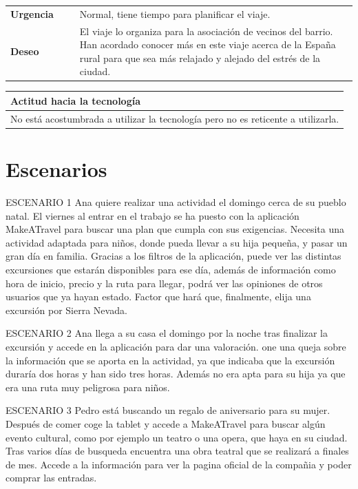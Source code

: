 \documentclass[11pt]{article}
\begin{document}
\begin{table}[H]
	\begin{tabular}{p{0.2\linewidth}|p{0.8\linewidth}}
		\toprule
		\textbf{Urgencia} & Normal, tiene tiempo para planificar el viaje.\\
		\textbf{Deseo}  & El viaje lo organiza para la asociación de vecinos del barrio. Han acordado conocer más en este viaje acerca de la España rural para que sea más relajado y alejado del estrés de la ciudad.\\
		\bottomrule
	\end{tabular}
	
	\begin{tabular}{p{1.028\linewidth}}
		\textbf{Actitud hacia la tecnología}\\
		\midrule
		No está acostumbrada a utilizar la tecnología pero no es reticente a utilizarla.
	\end{tabular}
\end{table}

\newpage
\section{Escenarios}
ESCENARIO 1
Ana quiere realizar una actividad el domingo cerca de su pueblo natal. El viernes al entrar en el trabajo se ha puesto con la aplicación MakeATravel para buscar una plan que cumpla con sus exigencias.
Necesita una actividad adaptada para niños, donde pueda llevar a su hija pequeña, y pasar un gran día en familia.
Gracias a los filtros de la aplicación, puede ver las distintas excursiones que estarán disponibles para ese día, además de información como hora de inicio, precio y la ruta para llegar, podrá ver las opiniones de otros usuarios que ya hayan estado. Factor que hará que, finalmente, elija una excursión por Sierra Nevada.

ESCENARIO 2
Ana llega a su casa el domingo por la noche tras finalizar la excursión y accede en la aplicación para dar una valoración. one una queja sobre la información que se aporta en la actividad, ya que indicaba que la excursión duraría dos horas y han sido tres horas. Además no era apta para su hija ya que era una ruta muy peligrosa para niños.

ESCENARIO 3
Pedro está buscando un regalo de aniversario para su mujer. Después de comer coge la tablet y accede a MakeATravel para buscar algún evento cultural, como por ejemplo un teatro o una opera, que haya en su ciudad. Tras varios días de busqueda encuentra una obra teatral que se realizará a finales de mes. Accede a la información para ver la pagina oficial de la compañia y poder comprar las entradas.
\end{document}

